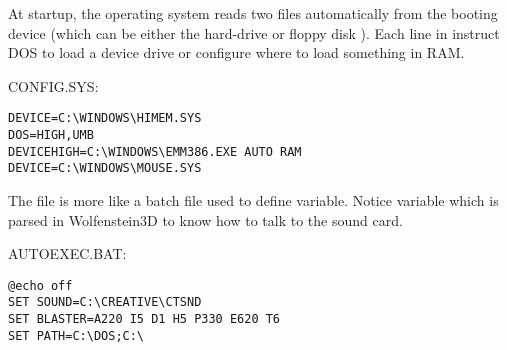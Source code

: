 \documentclass[book.tex]{subfiles}
\begin{document}
At startup, the operating system reads two files automatically from the booting device (which can be either the hard-drive  or floppy disk ). Each line 
in  instruct DOS to load a device drive or configure where to load something in RAM. 
\par
CONFIG.SYS:\\
 \begin{lstlisting}[breaklines=true,breakindent=0em]
DEVICE=C:\WINDOWS\HIMEM.SYS
DOS=HIGH,UMB
DEVICEHIGH=C:\WINDOWS\EMM386.EXE AUTO RAM
DEVICE=C:\WINDOWS\MOUSE.SYS
\end{lstlisting}
\par
The file  is more like a batch file used to define variable. Notice  variable which is parsed in Wolfenstein3D to know how to talk to the sound card.\\
\par
AUTOEXEC.BAT:\\
 \begin{lstlisting}[breaklines=true,breakindent=0em]
@echo off
SET SOUND=C:\CREATIVE\CTSND
SET BLASTER=A220 I5 D1 H5 P330 E620 T6
SET PATH=C:\DOS;C:\ 
\end{lstlisting}
\end{document}
